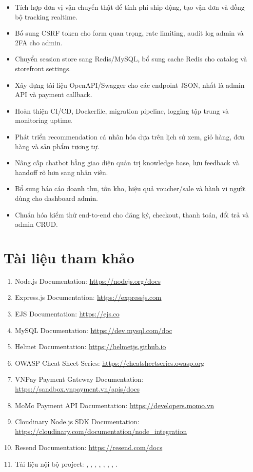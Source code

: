 \documentclass[12pt,a4paper]{report}
\begin{document}
\begin{itemize}
    \item Tích hợp đơn vị vận chuyển thật để tính phí ship động, tạo vận đơn và đồng bộ tracking realtime.
    \item Bổ sung CSRF token cho form quan trọng, rate limiting, audit log admin và 2FA cho admin.
    \item Chuyển session store sang Redis/MySQL, bổ sung cache Redis cho catalog và storefront settings.
    \item Xây dựng tài liệu OpenAPI/Swagger cho các endpoint JSON, nhất là admin API và payment callback.
    \item Hoàn thiện CI/CD, Dockerfile, migration pipeline, logging tập trung và monitoring uptime.
    \item Phát triển recommendation cá nhân hóa dựa trên lịch sử xem, giỏ hàng, đơn hàng và sản phẩm tương tự.
    \item Nâng cấp chatbot bằng giao diện quản trị knowledge base, lưu feedback và handoff rõ hơn sang nhân viên.
    \item Bổ sung báo cáo doanh thu, tồn kho, hiệu quả voucher/sale và hành vi người dùng cho dashboard admin.
    \item Chuẩn hóa kiểm thử end-to-end cho đăng ký, checkout, thanh toán, đổi trả và admin CRUD.
\end{itemize}

\chapter*{Tài liệu tham khảo}

\begin{enumerate}
    \item Node.js Documentation: \url{https://nodejs.org/docs}
    \item Express.js Documentation: \url{https://expressjs.com}
    \item EJS Documentation: \url{https://ejs.co}
    \item MySQL Documentation: \url{https://dev.mysql.com/doc}
    \item Helmet Documentation: \url{https://helmetjs.github.io}
    \item OWASP Cheat Sheet Series: \url{https://cheatsheetseries.owasp.org}
    \item VNPay Payment Gateway Documentation: \url{https://sandbox.vnpayment.vn/apis/docs}
    \item MoMo Payment API Documentation: \url{https://developers.momo.vn}
    \item Cloudinary Node.js SDK Documentation: \url{https://cloudinary.com/documentation/node_integration}
    \item Resend Documentation: \url{https://resend.com/docs}
    \item Tài liệu nội bộ project: , , , , , , , .
\end{enumerate}
\end{document}
